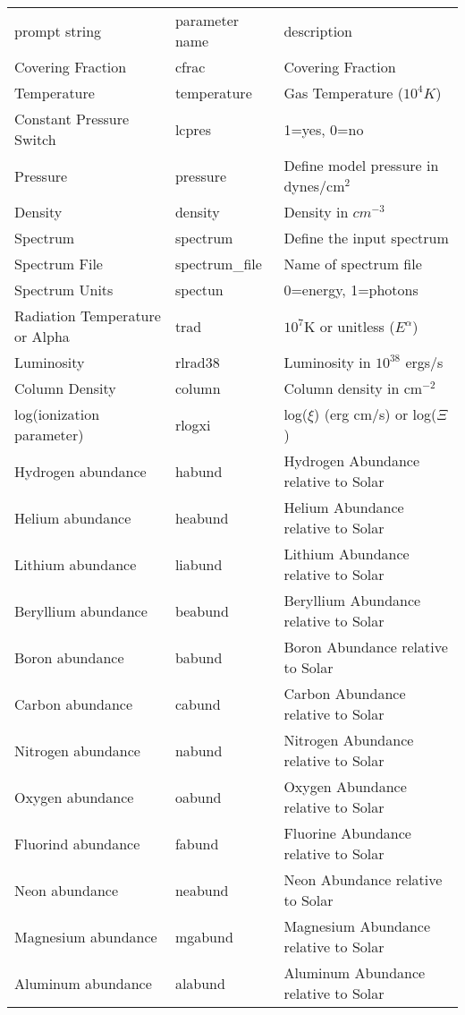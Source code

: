 \begin{tabular}{lll}
	prompt string & parameter name & description \\
	Covering Fraction & cfrac &  Covering Fraction \\ 
	Temperature & temperature & Gas Temperature ($10^4 K$)  \\ 
	Constant Pressure Switch & lcpres & 1=yes, 0=no  \\ 
	Pressure & pressure & Define model pressure in dynes/cm$^2$  \\ 
	Density & density & Density in $cm^{-3}$ \\ 
	Spectrum & spectrum & Define the input spectrum  \\ 
	Spectrum File & spectrum\_file & Name of spectrum file  \\ 
	Spectrum Units & spectun & 0=energy, 1=photons \\ 
	Radiation Temperature or Alpha & trad & $10^7$K or unitless ($E^{\alpha}$)\\
	Luminosity & rlrad38 & Luminosity in $10^{38}$ ergs/s  \\ 
	Column Density & column & Column density in cm$^{-2}$ \\ 
	log(ionization parameter) & rlogxi & log($\xi$) (erg cm/s) or log($\Xi$)  \\ 
	Hydrogen abundance & habund & Hydrogen Abundance relative to Solar  \\ 
	Helium abundance & heabund & Helium Abundance relative to Solar  \\ 
	Lithium abundance & liabund & Lithium Abundance relative to Solar  \\ 
	Beryllium abundance & beabund & Beryllium Abundance relative to Solar  \\ 
	Boron abundance & babund & Boron Abundance relative to Solar  \\ 
    Carbon abundance & cabund & Carbon Abundance relative to Solar  \\ 
    Nitrogen abundance & nabund & Nitrogen Abundance relative to Solar  \\ 
    Oxygen abundance & oabund & Oxygen Abundance relative to Solar  \\ 
    Fluorind abundance & fabund & Fluorine Abundance relative to Solar  \\ 
    Neon abundance & neabund & Neon Abundance relative to Solar  \\ 
    Magnesium abundance & mgabund & Magnesium Abundance relative to Solar  \\ 
    Aluminum abundance & alabund & Aluminum Abundance relative to Solar  \\ 

\end{tabular}
